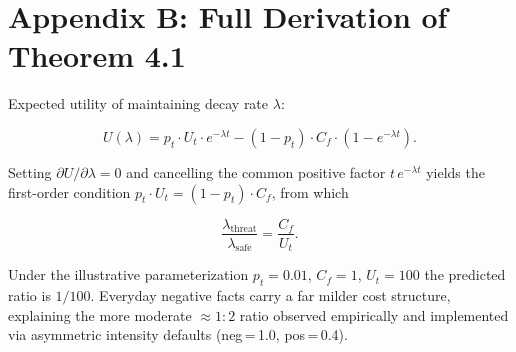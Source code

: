\documentclass[]{article}
\begin{document}
\hypertarget{appendix-b-full-derivation-of-theorem-4.1}{%
\section{\texorpdfstring{\textbf{Appendix B: Full Derivation of Theorem
4.1}}{Appendix B: Full Derivation of Theorem 4.1}}\label{appendix-b-full-derivation-of-theorem-4.1}}

Expected utility of maintaining decay rate \(\lambda\):

\[
U(\lambda)=p_t\cdot U_t\cdot e^{-\lambda t}-(1-p_t)\cdot C_f\cdot(1-e^{-\lambda t}).
\]

Setting \(\partial U/\partial\lambda=0\) and cancelling the common positive
factor \(t\,e^{-\lambda t}\) yields the first-order condition
\(p_t\cdot U_t=(1-p_t)\cdot C_f\), from which

\[
\frac{\lambda_{\text{threat}}}{\lambda_{\text{safe}}}=\frac{C_f}{U_t}.
\]

Under the illustrative parameterization \(p_t=0.01\), \(C_f=1\), \(U_t=100\)
the predicted ratio is \(1/100\). Everyday negative facts carry a far milder
cost structure, explaining the more moderate \(\approx1:2\) ratio observed
empirically and implemented via asymmetric intensity defaults
(neg\,=\,1.0, pos\,=\,0.4).
\end{document}
